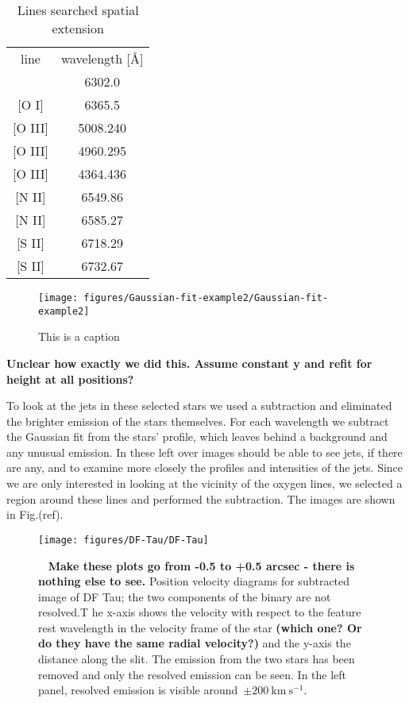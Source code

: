 \documentclass[twocolumn]{aastex62}
\begin{document}

\begin{table}[h]
\caption{{Lines searched spatial extension\label{tab:searchedlines}}}
\begin{tabular}{cc}
\hline\hline
line & wavelength [\AA] \\{}
\hline
[O I] & 6302.0\\{}
[O I] & 6365.5\\{}
[O III] & 5008.240\\{}
[O III] & 4960.295\\{}
[O III] & 4364.436\\{}
[N II] & 6549.86\\{}
[N II] & 6585.27\\{}
[S II] & 6718.29\\{}
[S II] & 6732.67\\
\hline
\end{tabular}
\end{table}





\begin{figure}[h!]
\begin{center}
\texttt{[image: figures/Gaussian-fit-example2/Gaussian-fit-example2]}
\caption{This is a caption
}
\end{center}
\end{figure}

\textbf{Unclear how exactly we did this. Assume constant y and refit for
height at all positions?}

To look at the jets in these selected stars we used a subtraction and
eliminated the brighter emission of the stars themselves. For each
wavelength we subtract the Gaussian fit from the stars' profile, which
leaves behind a background and any unusual emission. In these left over
images should be able to see jets, if there are any, and to examine more
closely the profiles and intensities of the jets. Since we are only
interested in looking at the vicinity of the oxygen lines, we selected a
region around these lines and performed the subtraction. The images are
shown in Fig.(ref).




\begin{figure}[h!]
\begin{center}
\texttt{[image: figures/DF-Tau/DF-Tau]}
\caption{\textbf{~} \textbf{Make these plots go from -0.5 to +0.5 arcsec - there
is nothing else to see.} Position velocity diagrams for subtracted image
of DF Tau; the two components of the binary are not resolved.T he x-axis
shows the velocity with respect to the feature rest wavelength in the
velocity frame of the star \textbf{(which one? Or do they have the same
radial velocity?)} and the y-axis the distance along the slit. The
emission from the two stars has been removed and only the resolved
emission can be seen. In the left panel, resolved emission is visible
around~\(\pm200\ \mathrm{km\ s^{-1}}\).
}
\end{center}
\end{figure}
\end{document}
